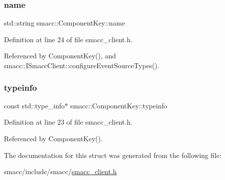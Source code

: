 \subsubsection{\texorpdfstring{name}{name}}
{\footnotesize\ttfamily std\+::string smacc\+::\+Component\+Key\+::name}



Definition at line 24 of file smacc\+\_\+client.\+h.



Referenced by Component\+Key(), and smacc\+::\+I\+Smacc\+Client\+::configure\+Event\+Source\+Types().

\mbox{\label{structsmacc_1_1ComponentKey_a148bab7ba01039d4bcabfd93529b333a}} 
\subsubsection{\texorpdfstring{typeinfo}{typeinfo}}
{\footnotesize\ttfamily const std\+::type\+\_\+info$\ast$ smacc\+::\+Component\+Key\+::typeinfo}



Definition at line 23 of file smacc\+\_\+client.\+h.



Referenced by Component\+Key().



The documentation for this struct was generated from the following file\+:\begin{DoxyCompactItemize}
\item 
smacc/include/smacc/\hyperlink{smacc__client_8h}{smacc\+\_\+client.\+h}\end{DoxyCompactItemize}
